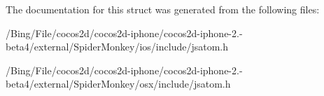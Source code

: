 The documentation for this struct was generated from the following files\-:\begin{DoxyCompactItemize}
\item 
/\-Bing/\-File/cocos2d/cocos2d-\/iphone/cocos2d-\/iphone-\/2.-\/beta4/external/\-Spider\-Monkey/ios/include/jsatom.\-h\item 
/\-Bing/\-File/cocos2d/cocos2d-\/iphone/cocos2d-\/iphone-\/2.-\/beta4/external/\-Spider\-Monkey/osx/include/jsatom.\-h\end{DoxyCompactItemize}
